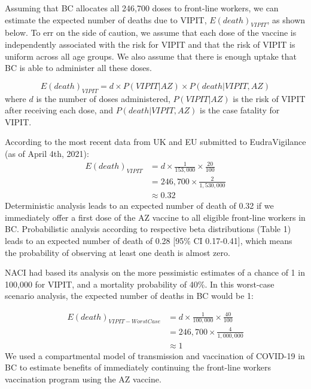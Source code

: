 \documentclass[]{interact}
\theoremstyle{plain}%
\theoremstyle{definition}
\theoremstyle{remark}
\begin{document}
Assuming that BC allocates all 246,700 doses to front-line workers, we
can estimate the expected number of deaths due to VIPIT,
\(E(death)_{VIPIT}\), as shown below. To err on the side of caution, we
assume that each dose of the vaccine is independently associated with
the risk for VIPIT and that the risk of VIPIT is uniform across all age
groups. We also assume that there is enough uptake that BC is able to
administer all these doses.

\[
E(death)_{VIPIT}  = d \times P(VIPIT|AZ) \times P(death|VIPIT, AZ)
\] where \(d\) is the number of doses administered, \(P(VIPIT|AZ)\) is
the risk of VIPIT after receiving each dose, and \(P(death|VIPIT, AZ)\)
is the case fatality for VIPIT.

According to the most recent data from UK and EU submitted to
EudraVigilance (as of April 4th, 2021): \[
\begin{aligned}
E(death)_{VIPIT} & = d \times \frac{1}{153,000} \times \frac{20}{100} \\
& = 246,700 \times \frac{2}{1,530,000} \\
& \approx 0.32
\end{aligned}
\] Deterministic analysis leads to an expected number of death of 0.32
if we immediately offer a first dose of the AZ vaccine to all eligible
front-line workers in BC. Probabilistic analysis according to respective
beta distributions (Table 1) leads to an expected number of death of
0.28 {[}95\% CI 0.17-0.41{]}, which means the probability of observing
at least one death is almost zero.

NACI had based its analysis on the more pessimistic estimates of a
chance of 1 in 100,000 for VIPIT, and a mortality probability of 40\%.
In this worst-case scenario analysis, the expected number of deaths in
BC would be 1:

\[
\begin{aligned}
E(death)_{VIPIT-Worst Case} & = d \times \frac{1}{100,000} \times \frac{40}{100} \\
& = 246,700 \times \frac{4}{1,000,000} \\
& \approx 1
\end{aligned}
\] We used a compartmental model of transmission and vaccination of
COVID-19 in BC to estimate benefits of immediately continuing the
front-line workers vaccination program using the AZ vaccine.
\end{document}
